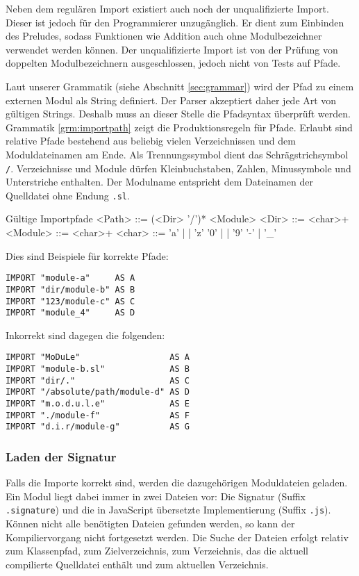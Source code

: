 \documentclass[runningheads]{llncs}
\begin{document}
Neben dem regulären Import existiert auch noch der unqualifizierte Import. Dieser ist jedoch für den Programmierer unzugänglich. Er dient zum Einbinden des Preludes, sodass Funktionen wie Addition auch ohne Modulbezeichner verwendet werden können. Der unqualifizierte Import ist von der Prüfung von doppelten Modulbezeichnern ausgeschlossen, jedoch nicht von Tests auf Pfade.

Laut unserer Grammatik (siehe Abschnitt \ref{sec:grammar}) wird der Pfad zu einem externen Modul als String definiert. Der Parser akzeptiert daher jede Art von gültigen Strings. Deshalb muss an dieser Stelle die Pfadsyntax überprüft werden. Grammatik \ref{grm:importpath} zeigt die Produktionsregeln für Pfade. Erlaubt sind relative Pfade bestehend aus beliebig vielen Verzeichnissen und dem Moduldateinamen am Ende. Als Trennungssymbol dient das Schrägstrichsymbol \texttt{/}. Verzeichnisse und Module dürfen Kleinbuchstaben, Zahlen, Minussymbole und Unterstriche enthalten. Der Modulname entspricht dem Dateinamen der Quelldatei ohne Endung \texttt{.sl}.

\begin{grammarfigure}{Gültige Importpfade}
  <Path>   ::= (<Dir> '/')* <Module>
  <Dir>    ::= <char>+
  <Module> ::= <char>+
  <char>   ::= 'a' | \cdots | 'z'
          \alt '0' | \cdots | '9'
          \alt '-' | '\_'
\end{grammarfigure}

Dies sind Beispiele für korrekte Pfade:

\begin{verbatim}
IMPORT "module-a"     AS A
IMPORT "dir/module-b" AS B
IMPORT "123/module-c" AS C
IMPORT "module_4"     AS D
\end{verbatim}

Inkorrekt sind dagegen die folgenden:

\begin{verbatim}
IMPORT "MoDuLe"                  AS A
IMPORT "module-b.sl"             AS B
IMPORT "dir/."                   AS C
IMPORT "/absolute/path/module-d" AS D
IMPORT "m.o.d.u.l.e"             AS E
IMPORT "./module-f"              AS F
IMPORT "d.i.r/module-g"          AS G
\end{verbatim}

\subsubsection{Laden der Signatur}

Falls die Importe korrekt sind, werden die dazugehörigen Moduldateien geladen. Ein Modul liegt dabei immer in zwei Dateien vor: Die Signatur (Suffix \texttt{.signature}) und die in JavaScript übersetzte Implementierung  (Suffix \texttt{.js}). Können nicht alle benötigten Dateien gefunden werden, so kann der Kompiliervorgang nicht fortgesetzt werden. Die Suche der Dateien erfolgt relativ zum Klassenpfad, zum Zielverzeichnis, zum Verzeichnis, das die aktuell compilierte Quelldatei enthält und zum aktuellen Verzeichnis.
\end{document}
